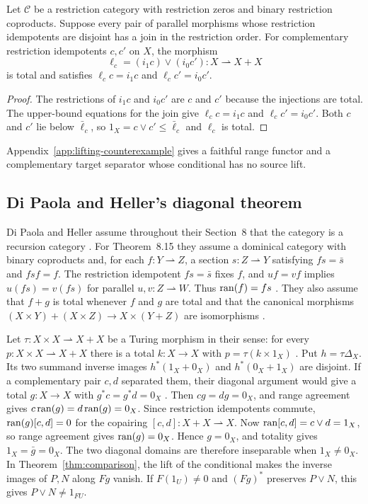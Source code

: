 \begin{proposition}\label{prop:disjoint-joins}
Let $\mathcal C$ be a restriction category with restriction zeros and
binary restriction coproducts. Suppose every pair of parallel morphisms
whose restriction idempotents are disjoint has a join in the restriction
order.
For complementary restriction idempotents $c,c'$ on $X$, the morphism
\[
 \ell_c=(i_1c)\vee(i_0c'):X\rightharpoonup X+X
\]
is total and satisfies $\ell_cc=i_1c$ and $\ell_cc'=i_0c'$.
\end{proposition}
\begin{proof}
The restrictions of $i_1c$ and $i_0c'$ are $c$ and $c'$ because
the injections are total. The upper-bound equations for the join
give $\ell_cc=i_1c$ and $\ell_cc'=i_0c'$.
Both $c$ and $c'$ lie below $\bar\ell_c$, so
$1_X=c\vee c'\le\bar\ell_c$ and $\ell_c$ is total.
\end{proof}

Appendix~\ref{app:lifting-counterexample} gives a faithful range functor
and a complementary target separator whose conditional has no source lift.

\subsection{Di Paola and Heller's diagonal theorem}
\label{subsec:di-paola-heller-diagonal}

Di Paola and Heller assume throughout their Section~8 that the category
is a recursion category \cite[p.~621]{DPH}. For Theorem~8.15 they
assume a dominical category with binary coproducts and, for each
$f:Y\rightharpoonup Z$, a section $s:Z\rightharpoonup Y$ satisfying
$fs=\bar s$ and $fsf=f$. The restriction idempotent $fs=\bar s$
fixes $f$, and $uf=vf$ implies $u(fs)=v(fs)$ for parallel
$u,v:Z\rightharpoonup W$. Thus $\operatorname{ran}(f)=fs$
\cite[p.~612, Definitions~6.1--6.2]{DPH}.
They also assume that $f+g$ is total whenever $f$ and $g$ are total
and that the canonical morphisms
$(X\times Y)+(X\times Z)\to X\times(Y+Z)$ are isomorphisms
\cite[p.~615, Definition~7.1]{DPH}.

Let $\tau:X\times X\rightharpoonup X+X$ be a Turing morphism in their
sense: for every $p:X\times X\rightharpoonup X+X$ there is a total
$k:X\to X$ with $p=\tau(k\times 1_X)$ \cite[p.~601, Definition~4.1]{DPH}.
Put $h=\tau\Delta_X$. Its two summand inverse images
$h^*(1_X+0_X)$ and $h^*(0_X+1_X)$ are disjoint. If a complementary
pair $c,d$ separated them, their diagonal argument would give a total
$g:X\to X$ with $g^*c=g^*d=0_X$
\cite[pp.~625--626, Theorem~8.15]{DPH}. Then $cg=dg=0_X$, and range
agreement gives $c\operatorname{ran}(g)=d\operatorname{ran}(g)=0_X$. Since restriction idempotents
commute, $\operatorname{ran}(g)[c,d]=0$ for the copairing $[c,d]:X+X\rightharpoonup X$.
Now $\operatorname{ran}[c,d]=c\vee d=1_X$, so range agreement gives $\operatorname{ran}(g)=0_X$.
Hence $g=0_X$, and totality gives $1_X=\bar g=0_X$. The two diagonal
domains are therefore inseparable when $1_X\ne0_X$.
In Theorem~\ref{thm:comparison}, the lift of the conditional makes the
inverse images of $P,N$ along $Fg$ vanish. If $F(1_U)\ne 0$ and
$(Fg)^*$ preserves $P\vee N$, this gives $P\vee N\ne 1_{FU}$.
